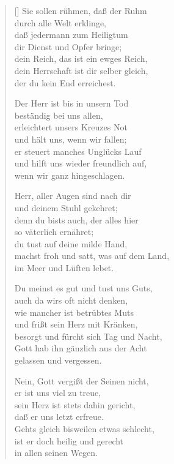 \begin{multicols}{2}
\begin{verse}[\versewidth]
 Sie sollen rühmen, daß der Ruhm\\
durch alle Welt erklinge,\\
daß jedermann zum Heiligtum\\
dir Dienst und Opfer bringe;\\
dein Reich, das ist ein ewges Reich,\\
dein Herrschaft ist dir selber gleich,\\
der du kein End erreichest.

 Der Herr ist bis in unsern Tod\\
beständig bei uns allen,\\
erleichtert unsers Kreuzes Not\\
und hält uns, wenn wir fallen;\\
er steuert manches Unglücks Lauf\\
und hilft uns wieder freundlich auf,\\
wenn wir ganz hingeschlagen.

 Herr, aller Augen sind nach dir\\
und deinem Stuhl gekehret;\\
denn du bists auch, der alles hier\\
so väterlich ernähret;\\
du tust auf deine milde Hand,\\
machst froh und satt, was auf dem Land,\\
im Meer und Lüften lebet.

 Du meinst es gut und tust uns Guts,\\
auch da wirs oft nicht denken,\\
wie mancher ist betrübtes Muts\\
und frißt sein Herz mit Kränken,\\
besorgt und fürcht sich Tag und Nacht,\\
Gott hab ihn gänzlich aus der Acht\\
gelassen und vergessen.

 Nein, Gott vergißt der Seinen nicht,\\
er ist uns viel zu treue,\\
sein Herz ist stets dahin gericht,\\
daß er uns letzt erfreue.\\
Gehts gleich bisweilen etwas schlecht,\\
ist er doch heilig und gerecht\\
in allen seinen Wegen.


\end{verse}
\end{multicols}
